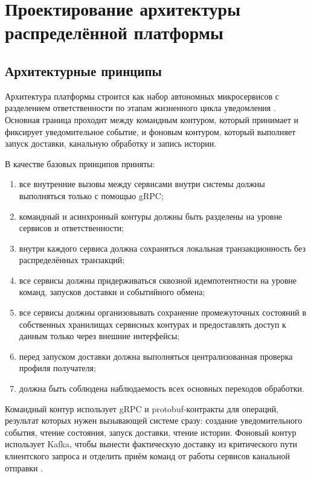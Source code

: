 \section{Проектирование архитектуры распределённой платформы}

\subsection{Архитектурные принципы}

Архитектура платформы строится как набор автономных микросервисов с разделением ответственности по этапам жизненного цикла уведомления \cite{newman_microservices,kleppmann_ddia}. Основная граница проходит между командным контуром, который принимает и фиксирует уведомительное событие, и фоновым контуром, который выполняет запуск доставки, канальную обработку и запись истории.

В качестве базовых принципов приняты:
\begin{enumerate}
    \item все внутренние вызовы между сервисами внутри системы должны выполняться только с помощью gRPC;
    \item командный и асинхронный контуры должны быть разделены на уровне сервисов и ответственности;
    \item внутри каждого сервиса должна сохраняться локальная транзакционность без распределённых транзакций;
    \item все сервисы должны придерживаться сквозной идемпотентности на уровне команд, запусков доставки и событийного обмена;
    \item все сервисы должны организовывать сохранение промежуточных состояний в собственных хранилищах сервисных контурах и предоставлять доступ к данным только через внешние интерфейсы;
    \item перед запуском доставки должна выполняться централизованная проверка профиля получателя;
    \item должна быть соблюдена наблюдаемость всех основных переходов обработки.
\end{enumerate}

Командный контур использует gRPC и protobuf-контракты для операций, результат которых нужен вызывающей системе сразу: создание уведомительного события, чтение состояния, запуск доставки, чтение истории. Фоновый контур использует Kafka, чтобы вынести фактическую доставку из критического пути клиентского запроса и отделить приём команд от работы сервисов канальной отправки \cite{grpc_docs,kafka_docs,nygard_releaseit}.

